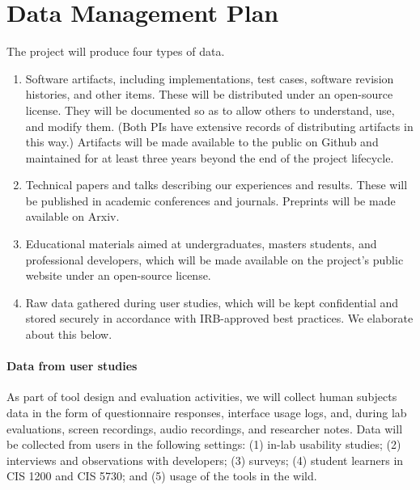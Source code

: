 \section*{Data Management Plan}

The project will produce four types of data.

\begin{enumerate}
\item Software artifacts,
including implementations, test cases, software revision histories, and
other items.  These will be distributed under an open-source
license.  They will be documented so as to allow others to understand,
use, and modify them.  (Both PIs have extensive records of
distributing artifacts in this way.)  Artifacts will be made available
to the public on Github and maintained for at least three years beyond
the end of the project lifecycle.

\item Technical papers and talks describing our experiences
and results.  These will be published in academic conferences and journals.
Preprints will be made available on Arxiv.

\item Educational materials aimed at undergraduates, masters students,
and professional developers, which will be made available on the
project's public website under an open-source license.

\item Raw data gathered during user studies, which will be kept
confidential and stored securely in accordance with IRB-approved best
practices. We elaborate about this below.
\end{enumerate}


\paragraph{Data from user studies}
As part of tool design and
evaluation activities, we will collect human subjects data in the form of questionnaire responses, interface usage
logs, and, during lab evaluations, screen recordings, audio recordings, and
researcher notes. Data will be collected from users in the following settings: (1)
in-lab usability studies; (2) interviews and observations with developers;
(3) surveys; (4) student learners in CIS 1200 and CIS 5730; and (5) usage of the tools
in the wild.

